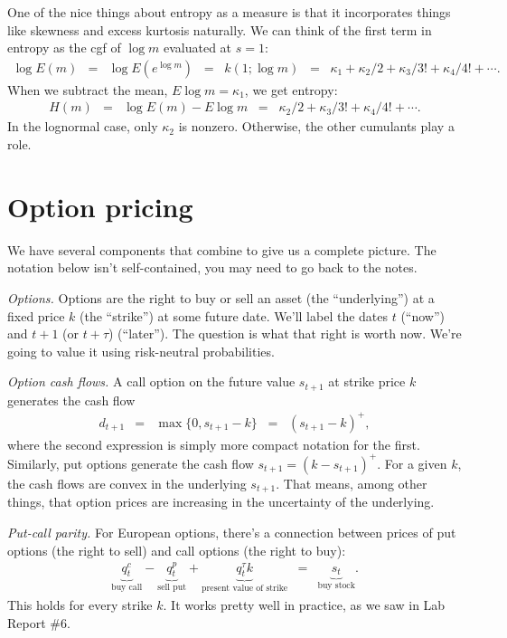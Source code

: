 \documentclass[11pt]{article}
\begin{document}
One of the nice things about entropy as a measure is that it incorporates
things like skewness and excess kurtosis naturally.
We can think of the first term in entropy as the cgf of $\log m$
evaluated at $s=1$:
\begin{eqnarray*}
   \log E(m) &=& \log E \left( e^{\log m}\right)
        \;\;=\;\; k(1; \log m)
        \;\;=\;\; \kappa_1 + \kappa_2/ 2 + \kappa_3/3! + \kappa_4/4! + \cdots .
\end{eqnarray*}
When we subtract the mean, $E \log m = \kappa_1$, we get entropy:
\begin{eqnarray*}
   H(m)  &=& \log E(m) - E \log m
        \;\;=\;\; \kappa_2/ 2 + \kappa_3/3! + \kappa_4/4! + \cdots .
\end{eqnarray*}
In the lognormal case, only $\kappa_2$ is nonzero.
Otherwise, the other cumulants play a role.


\section{Option pricing}

We have several components that combine to give us a complete picture.
The notation below isn't self-contained, you may need to go back to the notes.


{\it Options.\/}
Options are the right to buy or sell an asset
(the ``underlying'')
at a fixed price $k$ (the ``strike'')
at some future date.
We'll label the dates $t$ (``now'') and $t+1$ (or $t+\tau$) (``later'').
The question is what that right is worth now.
We're going to value it using risk-neutral probabilities.

{\it Option cash flows.\/}
A call option on the future value $ s_{t+1} $ at strike price $k$
generates the cash flow
\begin{eqnarray*}
        d_{t+1} &=& \max \{ 0, s_{t+1} - k \}
                \;\;=\;\;  (s_{t+1} - k)^+ ,
\end{eqnarray*}
where the second expression is simply more compact notation for the first.
Similarly, put options generate the cash flow $ s_{t+1} = (k - s_{t+1})^+ $.
For a given $k$, the cash flows are convex in the underlying $ s_{t+1}$.
That means, among other things, that option prices are increasing
in the uncertainty of the underlying.

{\it Put-call parity.\/}
For European options, there's a connection between prices of put options
(the right to sell) and call options (the right to buy):
\begin{eqnarray*}
    \underbrace{q^c_t}_{\mbox{buy call}} -
    \underbrace{q^p_t}_{\mbox{sell put}} +
    \underbrace{q^\tau_t k}_{\mbox{present value of strike}}
    &=&
    \underbrace{s_t}_{\mbox{buy stock}} .
    \label{eq:put-call-parity}
\end{eqnarray*}
This holds for every strike $k$.
It works pretty well in practice, as we saw in Lab Report \#6.
\end{document}
